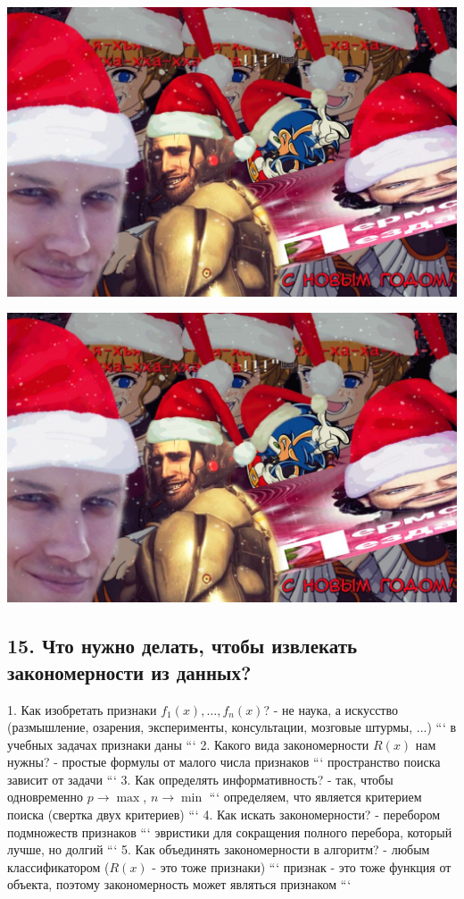 \includegraphics[scale=0.3]{figures/samplefigure.jpg}

\includegraphics[scale=0.3]{figures/samplefigure.jpg}

\subsection{15. Что нужно делать, чтобы извлекать закономерности из данных?}

1. Как изобретать признаки $f_1(x), \ldots, f_n(x)$?
    - не наука, а искусство (размышление, озарения, эксперименты,
    консультации, мозговые штурмы, ...)
```
в учебных задачах признаки даны
```
2. Какого вида закономерности $R(x)$ нам нужны?
    - простые формулы от малого числа признаков
```
пространство поиска зависит от задачи
```
3. Как определять информативность?
    - так, чтобы одновременно $p \rightarrow \max$, $n \rightarrow \min$
```
определяем, что является критерием поиска (свертка двух критериев)
```
4. Как искать закономерности?
    - перебором подмножеств признаков
```
эвристики для сокращения полного перебора, который лучше, но долгий
```
5. Как объединять закономерности в алгоритм?
    - любым классификатором ($R(x)$ - это тоже признаки)
```
признак - это тоже функция от объекта, поэтому закономерность может являться
признаком
```

